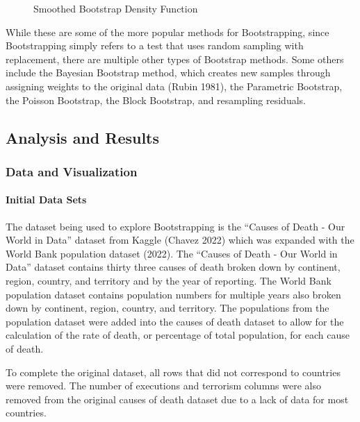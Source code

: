 \documentclass[
  letterpaper,
  DIV=11,
  numbers=noendperiod]{scrartcl}
\let\oldparagraph\paragraph
\renewcommand{\paragraph}[1]{\oldparagraph{#1}\mbox{}}
\begin{document}
\begin{figure}
\begin{minipage}[t]{0.50\linewidth}
{{}

\caption{\label{fig-2}Smoothed Bootstrap Density Function}

}

\end{minipage}%

\end{figure}

While these are some of the more popular methods for Bootstrapping,
since Bootstrapping simply refers to a test that uses random sampling
with replacement, there are multiple other types of Bootstrap methods.
Some others include the Bayesian Bootstrap method, which creates new
samples through assigning weights to the original data (Rubin 1981), the
Parametric Bootstrap, the Poisson Bootstrap, the Block Bootstrap, and
resampling residuals.

\hypertarget{analysis-and-results}{%
\subsection{Analysis and Results}\label{analysis-and-results}}

\hypertarget{data-and-visualization}{%
\subsubsection{Data and Visualization}\label{data-and-visualization}}

\hypertarget{initial-data-sets}{%
\paragraph{Initial Data Sets}\label{initial-data-sets}}

The dataset being used to explore Bootstrapping is the ``Causes of Death
- Our World in Data'' dataset from Kaggle (Chavez 2022) which was
expanded with the World Bank population dataset (2022). The ``Causes of
Death - Our World in Data'' dataset contains thirty three causes of
death broken down by continent, region, country, and territory and by
the year of reporting. The World Bank population dataset contains
population numbers for multiple years also broken down by continent,
region, country, and territory. The populations from the population
dataset were added into the causes of death dataset to allow for the
calculation of the rate of death, or percentage of total population, for
each cause of death.

To complete the original dataset, all rows that did not correspond to
countries were removed. The number of executions and terrorism columns
were also removed from the original causes of death dataset due to a
lack of data for most countries.
\end{document}
